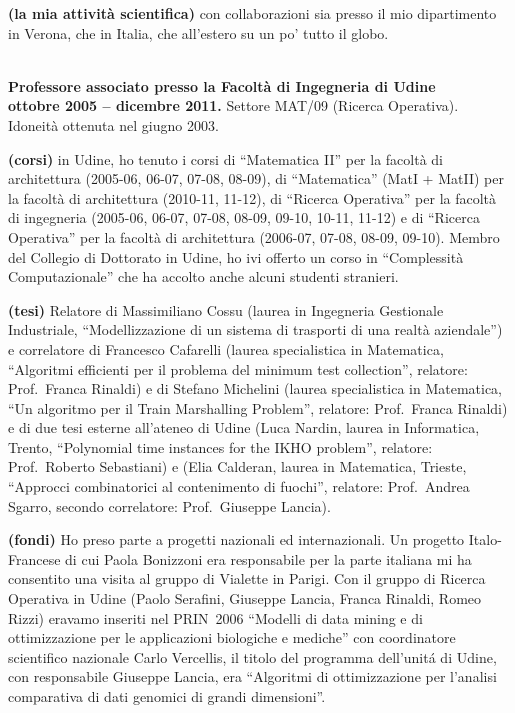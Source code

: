\documentclass[10pt]{article}
\newcommand{\voice}[1] { \bigskip \medskip \noindent {\Large \bf #1} \medskip\\ }
\newcommand{\subvoice}[1] { {\large \bf #1} \smallskip\\ }
\begin{document}
{\bf (la mia attivit\`a scientifica)}
con collaborazioni sia presso il mio dipartimento in Verona, che in Italia, che all'estero su un po' tutto il globo.


\vspace{1.8mm}

\voice{{\LARGE Esperienze di lavoro}}

\subvoice{Professore associato presso la
          Facolt\`a di Ingegneria di Udine}
{\bf ottobre 2005 -- dicembre 2011.}
Settore MAT/09 (Ricerca Operativa).
Idoneit\`a ottenuta nel giugno 2003.

{\bf (corsi)} in Udine,
ho tenuto i corsi di ``Matematica II''
per la facolt\`a di architettura
(2005-06, 06-07, 07-08, 08-09),
di ``Matematica'' (MatI + MatII)
per la facolt\`a di architettura (2010-11, 11-12),
di ``Ricerca Operativa''
per la facolt\`a di ingegneria
(2005-06, 06-07, 07-08, 08-09, 09-10, 10-11, 11-12)
e di ``Ricerca Operativa''
per la facolt\`a di architettura
(2006-07, 07-08, 08-09, 09-10).
Membro del Collegio di Dottorato in Udine,
ho ivi offerto un corso in ``Complessit\`a Computazionale''
che ha accolto anche alcuni studenti stranieri.

{\bf (tesi)} Relatore di Massimiliano Cossu
(laurea in Ingegneria Gestionale Industriale,
``Modellizzazione di un sistema di trasporti di una realt\`a aziendale'')
e correlatore di Francesco Cafarelli
(laurea specialistica in Matematica,
``Algoritmi efficienti per il problema del minimum test collection'',
relatore: Prof.~Franca Rinaldi)
e di Stefano Michelini (laurea specialistica in Matematica, ``Un algoritmo per il Train Marshalling Problem'', relatore: Prof.~Franca Rinaldi) %
e di due tesi esterne all'ateneo di Udine
(Luca Nardin, laurea in Informatica, Trento,%
``Polynomial time instances for the IKHO problem'',
relatore: Prof.~Roberto Sebastiani)
e (Elia Calderan, laurea in Matematica, Trieste,%
``Approcci combinatorici al contenimento di fuochi'',
relatore: Prof.~Andrea Sgarro,
secondo correlatore: Prof.~Giuseppe Lancia).

{\bf (fondi)} Ho preso parte a progetti nazionali ed internazionali.
Un progetto Italo-Francese di cui Paola Bonizzoni era responsabile per la parte italiana
mi ha consentito una visita al gruppo di Vialette in Parigi.
Con il gruppo di Ricerca Operativa in Udine (Paolo Serafini, Giuseppe Lancia, Franca Rinaldi, Romeo Rizzi) eravamo inseriti nel PRIN~2006 ``Modelli di data mining e di ottimizzazione per le applicazioni biologiche e mediche'' con coordinatore scientifico nazionale Carlo Vercellis, il titolo del programma dell'unit\'a di Udine, con responsabile Giuseppe Lancia,
era ``Algoritmi di ottimizzazione per l'analisi comparativa di dati genomici di grandi dimensioni''.
\end{document}
